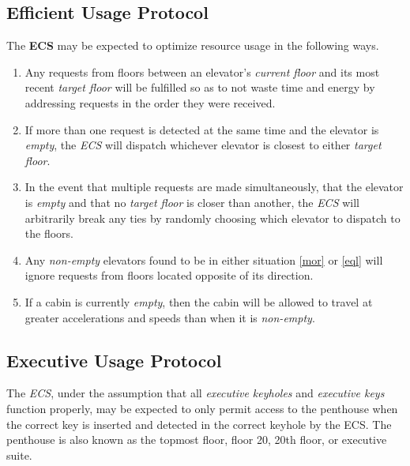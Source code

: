 \documentclass[12pt]{article}
\begin{document}
\subsection{Efficient Usage Protocol} The \textbf{ECS} may be expected to optimize resource usage in the following ways.
\begin{enumerate}
\item Any requests from floors between an elevator's \textit{current floor} and its most recent \textit{target floor} will be fulfilled so as to not waste time and energy by addressing requests in the order they were received.
\item \label{mor} If more than one request is detected at the same time and the elevator is \textit{empty}, the \textit{ECS} will dispatch whichever elevator is closest to either \textit{target floor}.
\item \label{eql} In the event that multiple requests are made simultaneously, that the elevator is \textit{empty} and that no \textit{target floor} is closer than another, the \textit{ECS} will arbitrarily break any ties by randomly choosing which elevator to dispatch to the floors.
\item Any \textit{non-empty} elevators found to be in either situation \ref{mor} or \ref{eql} will ignore requests from floors located opposite of its direction.
\item If a cabin is currently \textit{empty}, then the cabin will be allowed to travel at greater accelerations and speeds than when it is \textit{non-empty}.
\end{enumerate}

\subsection{Executive Usage Protocol} The \textit{ECS}, under the assumption that all \textit{executive keyholes} and \textit{executive keys} function properly, may be expected to only permit access to the penthouse when the correct key is inserted and detected in the correct keyhole by the ECS. The penthouse is also known as the topmost floor, floor 20, 20th floor, or executive suite.
\end{document}
